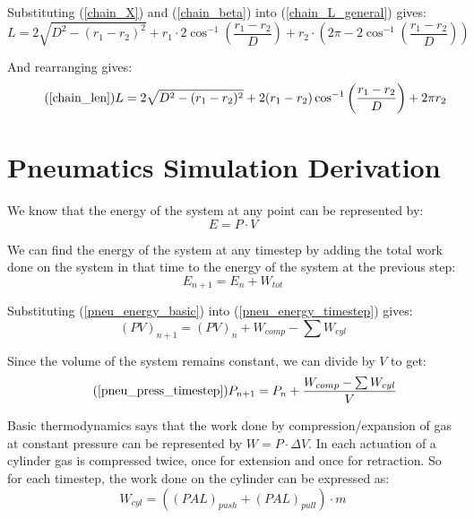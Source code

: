 \documentclass[11pt,a4paper,titlepage]{article}
\begin{document}
	Substituting (\ref{chain_X}) and (\ref{chain_beta}) into (\ref{chain_L_general}) gives:
	\begin{equation}
		L = 2 \sqrt{D^2 - (r_1 - r_2)^2} + r_1 \cdot 2 \cos^{-1} \left( \frac{r_1 - r_2}{D} \right) + r_2 \cdot \left( 2 \pi - 2 \cos^{-1} \left( \frac{r_1 - r_2}{D} \right) \right)
	\end{equation}
	
	And rearranging gives:
	\begin{equation} \tag{\ref*{chain_len}}
		L = 2 \sqrt{D^2 - (r_1 - r_2)^2} + 2 (r_1 - r_2) \cos^{-1} \left( \frac{r_1 - r_2}{D} \right) + 2 \pi r_2
	\end{equation}
	
	\newpage
	\section{Pneumatics Simulation Derivation} \label{appendixE}
	We know that the energy of the system at any point can be represented by:
	\begin{equation} \label{pneu_energy_basic}
		E = P \cdot V
	\end{equation}
	
	We can find the energy of the system at any timestep by adding the total work done on the system in that time to the energy of the system at the previous step:
	\begin{equation} \label{pneu_energy_timestep}
		E_{n+1} = E_n + W_{tot}
	\end{equation}
	
	Substituting (\ref{pneu_energy_basic}) into (\ref{pneu_energy_timestep}) gives:
	\begin{equation}
		(PV)_{n+1} = (PV)_n + W_{comp} - \sum W_{cyl}
	\end{equation}
	
	Since the volume of the system remains constant, we can divide by $V$ to get:
	\begin{equation} \tag{\ref*{pneu_press_timestep}}
		P_{n+1} = P_n + \frac{W_{comp} - \sum W_{cyl}}{V}
	\end{equation}
	
	Basic thermodynamics says that the work done by compression/expansion of gas at constant pressure can be represented by $W = P \cdot \Delta V$. In each actuation of a cylinder gas is compressed twice, once for extension and once for retraction. So for each timestep, the work done on the cylinder can be expressed as:
	\begin{equation}
		W_{cyl} = ((PAL)_{push} + (PAL)_{pull}) \cdot m
	\end{equation}
	
\end{document}
